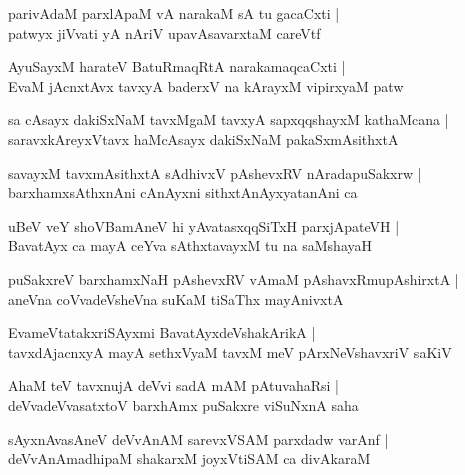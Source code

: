 \begin{shloka}
parivAdaM parxlApaM vA narakaM sA tu gacaCxti |\\
patwyx jiVvati yA nAriV upavAsavarxtaM careVtf 
\end{shloka}

\begin{shloka}
AyuSayxM harateV BatuRmaqRtA narakamaqcaCxti |\\
EvaM jAcnxtAvx tavxyA baderxV na kArayxM vipirxyaM patw
\end{shloka}

\begin{shloka}
sa cAsayx dakiSxNaM tavxMgaM tavxyA sapxqqshayxM kathaMcana |\\
saravxkAreyxVtavx haMcAsayx dakiSxNaM pakaSxmAsithxtA
\end{shloka}

\begin{shloka}
savayxM tavxmAsithxtA sAdhivxV pAshevxRV nAradapuSakxrw |\\
barxhamxsAthxnAni cAnAyxni sithxtAnAyxyatanAni ca 
\end{shloka}

\begin{shloka}
uBeV veY shoVBamAneV hi yAvatasxqqSiTxH parxjApateVH |\\
BavatAyx ca mayA ceYva sAthxtavayxM tu na saMshayaH 
\end{shloka}

\begin{shloka}
puSakxreV barxhamxNaH pAshevxRV vAmaM pAshavxRmupAshirxtA |\\
aneVna coVvadeVsheVna suKaM tiSaThx mayAnivxtA
\end{shloka}

\begin{shloka}
EvameVtatakxriSAyxmi BavatAyxdeVshakArikA |\\
tavxdAjacnxyA mayA sethxVyaM tavxM meV pArxNeVshavxriV saKiV
\end{shloka}

\begin{shloka}
AhaM teV tavxnujA deVvi sadA mAM pAtuvahaRsi |\\
deVvadeVvasatxtoV barxhAmx puSakxre viSuNxnA saha 
\end{shloka}

\begin{shloka}
sAyxnAvasAneV deVvAnAM sarevxVSAM parxdadw varAnf |\\
deVvAnAmadhipaM shakarxM joyxVtiSAM ca divAkaraM 
\end{shloka}

